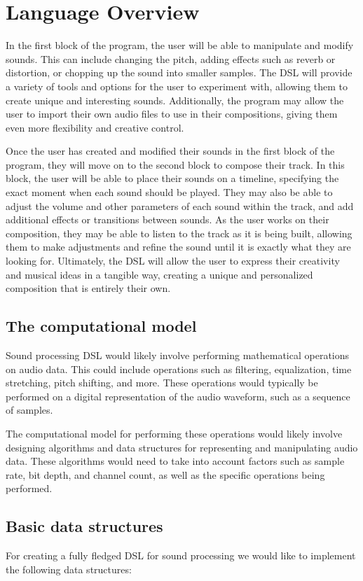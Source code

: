 \chapter{Language Overview}

In the first block of the program, the user will be able to manipulate and modify sounds. This can include changing the pitch, adding effects such as reverb or distortion, or chopping up the sound into smaller samples. The DSL will provide a variety of tools and options for the user to experiment with, allowing them to create unique and interesting sounds. Additionally, the program may allow the user to import their own audio files to use in their compositions, giving them even more flexibility and creative control.

Once the user has created and modified their sounds in the first block of the program, they will move on to the second block to compose their track. In this block, the user will be able to place their sounds on a timeline, specifying the exact moment when each sound should be played. They may also be able to adjust the volume and other parameters of each sound within the track, and add additional effects or transitions between sounds. As the user works on their composition, they may be able to listen to the track as it is being built, allowing them to make adjustments and refine the sound until it is exactly what they are looking for. Ultimately, the DSL will allow the user to express their creativity and musical ideas in a tangible way, creating a unique and personalized composition that is entirely their own.

\section{The computational model}
Sound processing DSL would likely involve performing 
mathematical operations on audio data. This could include 
operations such as filtering, equalization, time stretching, pitch 
shifting, and more. These operations would typically be performed 
on a digital representation of the audio waveform, such as a 
sequence of samples.

The computational model for performing these operations would 
likely involve designing algorithms and data structures for 
representing and manipulating audio data. These algorithms would 
need to take into account factors such as sample rate, bit depth, 
and channel count, as well as the specific operations being 
performed.

\section{Basic data structures}
For creating a fully fledged DSL for sound processing we would like 
to implement the following data structures: 

